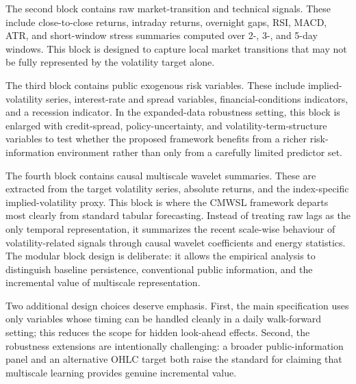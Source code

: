 The second block contains raw market-transition and technical signals. These include close-to-close returns, intraday returns, overnight gaps, RSI, MACD, ATR, and short-window stress summaries computed over 2-, 3-, and 5-day windows. This block is designed to capture local market transitions that may not be fully represented by the volatility target alone.

The third block contains public exogenous risk variables. These include implied-volatility series, interest-rate and spread variables, financial-conditions indicators, and a recession indicator. In the expanded-data robustness setting, this block is enlarged with credit-spread, policy-uncertainty, and volatility-term-structure variables to test whether the proposed framework benefits from a richer risk-information environment rather than only from a carefully limited predictor set.

The fourth block contains causal multiscale wavelet summaries. These are extracted from the target volatility series, absolute returns, and the index-specific implied-volatility proxy. This block is where the CMWSL framework departs most clearly from standard tabular forecasting. Instead of treating raw lags as the only temporal representation, it summarizes the recent scale-wise behaviour of volatility-related signals through causal wavelet coefficients and energy statistics. The modular block design is deliberate: it allows the empirical analysis to distinguish baseline persistence, conventional public information, and the incremental value of multiscale representation.

Two additional design choices deserve emphasis. First, the main specification uses only variables whose timing can be handled cleanly in a daily walk-forward setting; this reduces the scope for hidden look-ahead effects. Second, the robustness extensions are intentionally challenging: a broader public-information panel and an alternative OHLC target both raise the standard for claiming that multiscale learning provides genuine incremental value.
